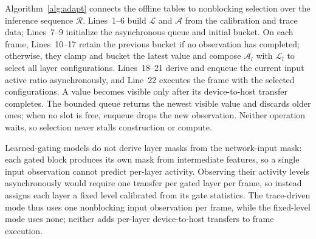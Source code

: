 Algorithm~\ref{alg:adapt} connects the offline tables to nonblocking selection
over the inference sequence $\mathcal{R}$. Lines~1--6 build $\mathcal{L}$ and
$\mathcal{A}$ from the calibration and trace data; Lines~7--9 initialize the
asynchronous queue and initial bucket. On each frame, Lines~10--17 retain the
previous bucket if no observation has completed; otherwise, they clamp and
bucket the latest value and compose $\mathcal{A}_l$ with $\mathcal{L}_l$ to
select all layer configurations. Lines~18--21 derive and enqueue the current
input active ratio asynchronously, and Line~22 executes the frame with the
selected configurations. A value becomes visible only after its device-to-host
transfer completes. The bounded queue returns the newest visible value and
discards older ones; when no slot is free, enqueue drops the new observation.
Neither operation waits, so selection never stalls construction or compute.

Learned-gating models do not derive layer masks from the network-input mask:
each gated block produces its own mask from intermediate features, so a single
input observation cannot predict per-layer activity. Observing
their activity levels asynchronously would require one transfer per gated layer
per frame, so \sysname instead assigns each layer a fixed level calibrated from
its gate statistics. The trace-driven mode thus uses one nonblocking input
observation per frame, while the fixed-level mode uses none; neither adds
per-layer device-to-host transfers to frame execution.
